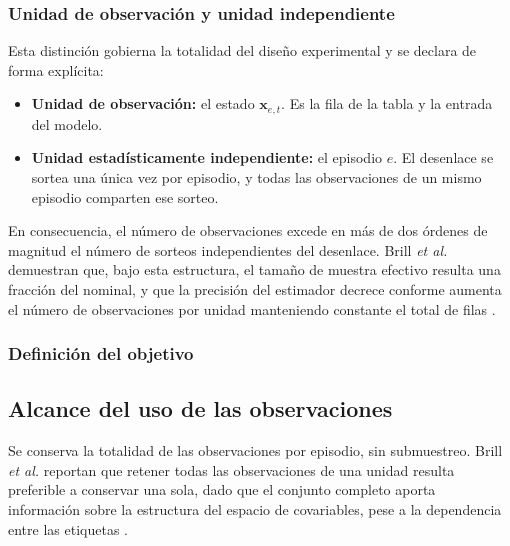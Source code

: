 \subsubsection{Unidad de observación y unidad independiente}

Esta distinción gobierna la totalidad del diseño experimental y se declara
de forma explícita:

\begin{itemize}
  \item \textbf{Unidad de observación:} el estado $\mathbf{x}_{e,t}$. Es la
        fila de la tabla y la entrada del modelo.
  \item \textbf{Unidad estadísticamente independiente:} el episodio $e$. El
        desenlace se sortea una única vez por episodio, y todas las
        observaciones de un mismo episodio comparten ese sorteo.
\end{itemize}

En consecuencia, el número de observaciones excede en más de dos órdenes de
magnitud el número de sorteos independientes del desenlace. Brill
\textit{et al.} demuestran que, bajo esta estructura, el tamaño de muestra
efectivo resulta una fracción del nominal, y que la precisión del estimador
decrece conforme aumenta el número de observaciones por unidad manteniendo
constante el total de filas \cite{brill_winprob_2026}.


\subsubsection{Definición del objetivo}


\subsection{Alcance del uso de las observaciones}
\label{subsec:alcanceobs}

Se conserva la totalidad de las observaciones por episodio, sin
submuestreo. Brill \textit{et al.} reportan que retener todas las
observaciones de una unidad resulta preferible a conservar una sola, dado
que el conjunto completo aporta información sobre la estructura del espacio
de covariables, pese a la dependencia entre las etiquetas
\cite{brill_winprob_2026}.

